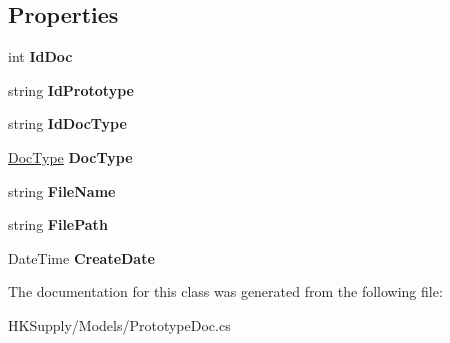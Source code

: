 \subsection*{Properties}
\begin{DoxyCompactItemize}
\item 
\mbox{\label{class_h_k_supply_1_1_models_1_1_prototype_doc_ac15c92fa0aabf25a39d6ef03b1da31b5}} 
int {\bfseries Id\+Doc}
\item 
\mbox{\label{class_h_k_supply_1_1_models_1_1_prototype_doc_a188163f0a591c655422be71ef9518ce7}} 
string {\bfseries Id\+Prototype}
\item 
\mbox{\label{class_h_k_supply_1_1_models_1_1_prototype_doc_a525df0e62220eb30a07474f43384be2c}} 
string {\bfseries Id\+Doc\+Type}
\item 
\mbox{\label{class_h_k_supply_1_1_models_1_1_prototype_doc_a392431299a9ff3de96eb098074432b1a}} 
\mbox{\hyperlink{class_h_k_supply_1_1_models_1_1_doc_type}{Doc\+Type}} {\bfseries Doc\+Type}
\item 
\mbox{\label{class_h_k_supply_1_1_models_1_1_prototype_doc_ac7314bbb9684cd470ecf43e575ccf95f}} 
string {\bfseries File\+Name}
\item 
\mbox{\label{class_h_k_supply_1_1_models_1_1_prototype_doc_aedb100cc398a955f9e846b375636636a}} 
string {\bfseries File\+Path}
\item 
\mbox{\label{class_h_k_supply_1_1_models_1_1_prototype_doc_abac863585a24ad7a5156fe9b2767fef2}} 
Date\+Time {\bfseries Create\+Date}
\end{DoxyCompactItemize}


The documentation for this class was generated from the following file\+:\begin{DoxyCompactItemize}
\item 
H\+K\+Supply/\+Models/Prototype\+Doc.\+cs\end{DoxyCompactItemize}
